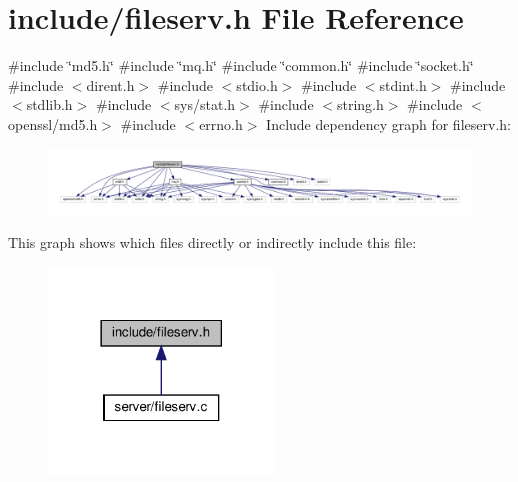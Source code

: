 \section{include/fileserv.h File Reference}
\label{fileserv_8h}
{\ttfamily \#include \char`\"{}md5.\+h\char`\"{}}\newline
{\ttfamily \#include \char`\"{}mq.\+h\char`\"{}}\newline
{\ttfamily \#include \char`\"{}common.\+h\char`\"{}}\newline
{\ttfamily \#include \char`\"{}socket.\+h\char`\"{}}\newline
{\ttfamily \#include $<$dirent.\+h$>$}\newline
{\ttfamily \#include $<$stdio.\+h$>$}\newline
{\ttfamily \#include $<$stdint.\+h$>$}\newline
{\ttfamily \#include $<$stdlib.\+h$>$}\newline
{\ttfamily \#include $<$sys/stat.\+h$>$}\newline
{\ttfamily \#include $<$string.\+h$>$}\newline
{\ttfamily \#include $<$openssl/md5.\+h$>$}\newline
{\ttfamily \#include $<$errno.\+h$>$}\newline
Include dependency graph for fileserv.\+h\+:\nopagebreak
\begin{figure}[H]
\begin{center}
\leavevmode
\includegraphics[width=350pt]{fileserv_8h__incl}
\end{center}
\end{figure}
This graph shows which files directly or indirectly include this file\+:\nopagebreak
\begin{figure}[H]
\begin{center}
\leavevmode
\includegraphics[width=170pt]{fileserv_8h__dep__incl}
\end{center}
\end{figure}

